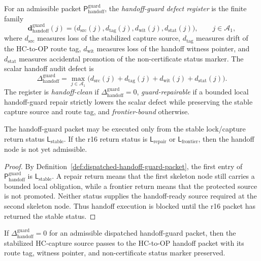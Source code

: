 \begin{definition}
\label{def:handoff-guard-defect-register}
For an admissible packet \(\mathsf P_{\mathrm{handoff}}^{\mathrm{guard}}\), the \emph{handoff-guard defect register} is the finite family
\[
  \mathbf d_{\mathrm{handoff}}^{\mathrm{guard}}(j)
  =
  \bigl(d_{\mathrm{src}}(j),d_{\mathrm{tag}}(j),d_{\mathrm{wit}}(j),d_{\mathrm{stat}}(j)\bigr),
  \qquad j\in\mathcal A_1,
\]
where \(d_{\mathrm{src}}\) measures loss of the stabilized capture source, \(d_{\mathrm{tag}}\) measures drift of the HC-to-OP route tag, \(d_{\mathrm{wit}}\) measures loss of the handoff witness pointer, and \(d_{\mathrm{stat}}\) measures accidental promotion of the non-certificate status marker.  The scalar handoff audit defect is
\[
  \Delta_{\mathrm{handoff}}^{\mathrm{guard}}
  =
  \max_{j\in\mathcal A_1}
  \bigl(d_{\mathrm{src}}(j)+d_{\mathrm{tag}}(j)+d_{\mathrm{wit}}(j)+d_{\mathrm{stat}}(j)\bigr).
\]
The register is \emph{handoff-clean} if \(\Delta_{\mathrm{handoff}}^{\mathrm{guard}}=0\), \emph{guard-repairable} if a bounded local handoff-guard repair strictly lowers the scalar defect while preserving the stable capture source and route tag, and \emph{frontier-bound} otherwise.
\end{definition}

\begin{lemma}
\label{lem:stable-lock-return-is-handoff-precondition}
The handoff-guard packet may be executed only from the stable lock/capture return status \(\mathsf L_{\mathrm{stable}}\).  If the r16 return status is \(\mathsf L_{\mathrm{repair}}\) or \(\mathsf L_{\mathrm{frontier}}\), then the handoff node is not yet admissible.
\end{lemma}

\begin{proof}
By Definition~\ref{def:dispatched-handoff-guard-packet}, the first entry of \(\mathsf P_{\mathrm{handoff}}^{\mathrm{guard}}\) is \(\mathsf L_{\mathrm{stable}}\).  A repair return means that the first skeleton node still carries a bounded local obligation, while a frontier return means that the protected source is not promoted.  Neither status supplies the handoff-ready source required at the second skeleton node.  Thus handoff execution is blocked until the r16 packet has returned the stable status.
\end{proof}

\begin{lemma}
\label{lem:zero-handoff-guard-defect-preserves-hcop-handoff}
If \(\Delta_{\mathrm{handoff}}^{\mathrm{guard}}=0\) for an admissible dispatched handoff-guard packet, then the stabilized HC-capture source passes to the HC-to-OP handoff packet with its route tag, witness pointer, and non-certificate status marker preserved.
\end{lemma}

